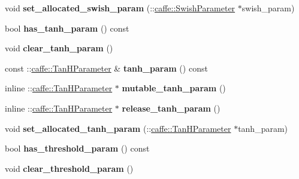 \begin{DoxyCompactItemize}
void {\bfseries set\+\_\+allocated\+\_\+swish\+\_\+param} (\+::\mbox{\hyperlink{classcaffe_1_1_swish_parameter}{caffe\+::\+Swish\+Parameter}} $\ast$swish\+\_\+param)
\item 
\mbox{\label{classcaffe_1_1_layer_parameter_a0cd70a95e1ba4c3ffc1b5d4dfd9b81a2}} 
bool {\bfseries has\+\_\+tanh\+\_\+param} () const
\item 
\mbox{\label{classcaffe_1_1_layer_parameter_aebc4bc59174bced491799e7d432bcd6f}} 
void {\bfseries clear\+\_\+tanh\+\_\+param} ()
\item 
\mbox{\label{classcaffe_1_1_layer_parameter_a851c2d03db155dd6341a1a8678f19e52}} 
const \+::\mbox{\hyperlink{classcaffe_1_1_tan_h_parameter}{caffe\+::\+Tan\+H\+Parameter}} \& {\bfseries tanh\+\_\+param} () const
\item 
\mbox{\label{classcaffe_1_1_layer_parameter_ac28fe475ec92441d7867d422c6f902c2}} 
inline \+::\mbox{\hyperlink{classcaffe_1_1_tan_h_parameter}{caffe\+::\+Tan\+H\+Parameter}} $\ast$ {\bfseries mutable\+\_\+tanh\+\_\+param} ()
\item 
\mbox{\label{classcaffe_1_1_layer_parameter_a819d0cbca31f1b81059773700a86c30f}} 
inline \+::\mbox{\hyperlink{classcaffe_1_1_tan_h_parameter}{caffe\+::\+Tan\+H\+Parameter}} $\ast$ {\bfseries release\+\_\+tanh\+\_\+param} ()
\item 
\mbox{\label{classcaffe_1_1_layer_parameter_ab97aefd60b8082725bfbce0fcfd5d27c}} 
void {\bfseries set\+\_\+allocated\+\_\+tanh\+\_\+param} (\+::\mbox{\hyperlink{classcaffe_1_1_tan_h_parameter}{caffe\+::\+Tan\+H\+Parameter}} $\ast$tanh\+\_\+param)
\item 
\mbox{\label{classcaffe_1_1_layer_parameter_aa6aac9ad37e2ed789f0be9ac156dd2b4}} 
bool {\bfseries has\+\_\+threshold\+\_\+param} () const
\item 
\mbox{\label{classcaffe_1_1_layer_parameter_a8f14e88722f9621be440fd150614af23}} 
void {\bfseries clear\+\_\+threshold\+\_\+param} ()
\item 

\end{DoxyCompactItemize}
